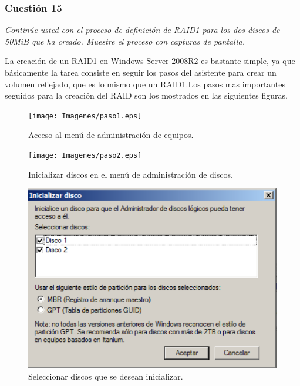 \subsubsection{Cuestión 15}
\textit{Continúe usted con el proceso de definición de RAID1 para los dos discos de 50MiB que ha creado. Muestre el proceso con capturas de pantalla.}\newline

La creación de un RAID1 en Windows Server 2008R2 es bastante simple, ya que básicamente la tarea consiste en seguir los pasos del asistente para crear un volumen reflejado, que es lo mismo que un RAID1.Los pasos mas importantes seguidos para la creación del RAID son los mostrados en las siguientes figuras. \cite{winraid}

\begin{figure}[H]
    \begin{center}
    \advance\leftskip-2.3cm
        \texttt{[image: Imagenes/paso1.eps]}
        \caption{Acceso al menú de administración de equipos.}
        \label{fig10}
    \end{center}
\end{figure}

\begin{figure}[H]
    \begin{center}
    \advance\leftskip-2cm
        \texttt{[image: Imagenes/paso2.eps]}
        \caption{Inicializar discos en el menú de administración de discos.}
        \label{fig11}
    \end{center}
\end{figure}

\begin{figure}[H]
    \begin{center}
        \includegraphics[scale=0.7]{Imagenes/paso3.eps}
        \caption{Seleccionar discos que se desean inicializar.}
        \label{fig12}
    \end{center}
\end{figure}


